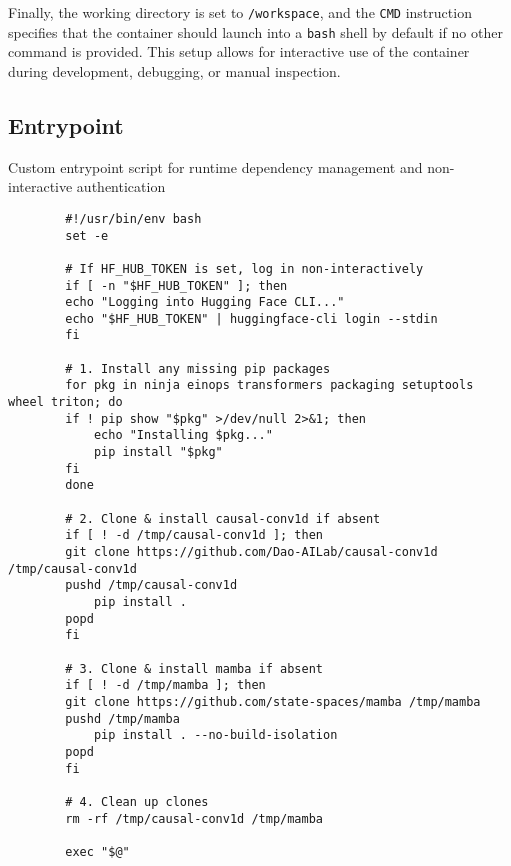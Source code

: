 Finally, the working directory is set to \texttt{/workspace}, and the \texttt{CMD} instruction specifies that the container should launch into a \texttt{bash} shell by default if no other command is provided. This setup allows for interactive use of the container during development, debugging, or manual inspection.

\vspace{1em}

\subsection{Entrypoint}

\begin{minipage}{\textwidth}
	\captionsetup{type=listing}
	\caption{Custom entrypoint script for runtime dependency management and non-interactive authentication}
	\label{lst:entrypoint}

	\begin{verbatim}
        #!/usr/bin/env bash
        set -e

        # If HF_HUB_TOKEN is set, log in non-interactively
        if [ -n "$HF_HUB_TOKEN" ]; then
        echo "Logging into Hugging Face CLI..."
        echo "$HF_HUB_TOKEN" | huggingface-cli login --stdin
        fi

        # 1. Install any missing pip packages
        for pkg in ninja einops transformers packaging setuptools wheel triton; do
        if ! pip show "$pkg" >/dev/null 2>&1; then
            echo "Installing $pkg..."
            pip install "$pkg"
        fi
        done

        # 2. Clone & install causal-conv1d if absent
        if [ ! -d /tmp/causal-conv1d ]; then
        git clone https://github.com/Dao-AILab/causal-conv1d /tmp/causal-conv1d
        pushd /tmp/causal-conv1d
            pip install .
        popd
        fi

        # 3. Clone & install mamba if absent
        if [ ! -d /tmp/mamba ]; then
        git clone https://github.com/state-spaces/mamba /tmp/mamba
        pushd /tmp/mamba
            pip install . --no-build-isolation
        popd
        fi

        # 4. Clean up clones
        rm -rf /tmp/causal-conv1d /tmp/mamba

        exec "$@"
    \end{verbatim}
\end{minipage}


